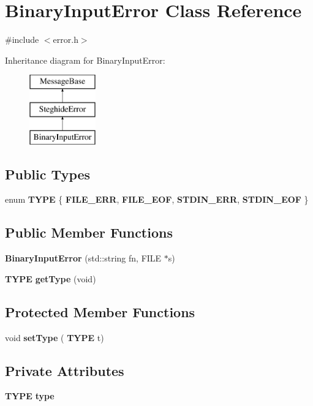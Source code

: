 \section{Binary\+Input\+Error Class Reference}
\label{classBinaryInputError}


{\ttfamily \#include $<$error.\+h$>$}

Inheritance diagram for Binary\+Input\+Error\+:\begin{figure}[H]
\begin{center}
\leavevmode
\includegraphics[height=3.000000cm]{classBinaryInputError}
\end{center}
\end{figure}
\subsection*{Public Types}
\begin{DoxyCompactItemize}
\item 
enum \textbf{ T\+Y\+PE} \{ \textbf{ F\+I\+L\+E\+\_\+\+E\+RR}, 
\textbf{ F\+I\+L\+E\+\_\+\+E\+OF}, 
\textbf{ S\+T\+D\+I\+N\+\_\+\+E\+RR}, 
\textbf{ S\+T\+D\+I\+N\+\_\+\+E\+OF}
 \}
\end{DoxyCompactItemize}
\subsection*{Public Member Functions}
\begin{DoxyCompactItemize}
\item 
\textbf{ Binary\+Input\+Error} (std\+::string fn, F\+I\+LE $\ast$s)
\item 
\textbf{ T\+Y\+PE} \textbf{ get\+Type} (void)
\end{DoxyCompactItemize}
\subsection*{Protected Member Functions}
\begin{DoxyCompactItemize}
\item 
void \textbf{ set\+Type} (\textbf{ T\+Y\+PE} t)
\end{DoxyCompactItemize}
\subsection*{Private Attributes}
\begin{DoxyCompactItemize}
\item 
\textbf{ T\+Y\+PE} \textbf{ type}
\end{DoxyCompactItemize}
